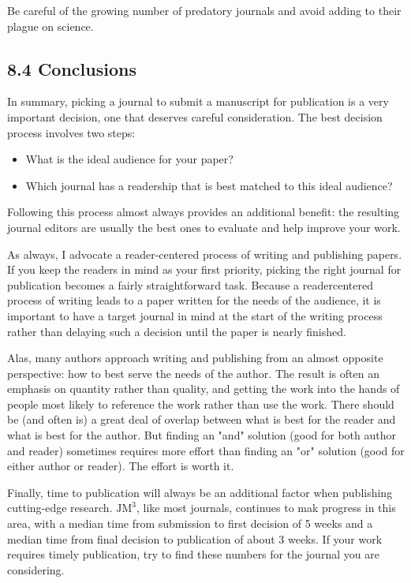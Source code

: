 Be careful of the growing number of predatory journals and avoid adding to their plague on science.

\subsection*{8.4 Conclusions}
In summary, picking a journal to submit a manuscript for publication is a very important decision, one that deserves careful consideration. The best decision process involves two steps:

\begin{itemize}
  \item What is the ideal audience for your paper?
  \item Which journal has a readership that is best matched to this ideal audience?
\end{itemize}

Following this process almost always provides an additional benefit: the resulting journal editors are usually the best ones to evaluate and help improve your work.

As always, I advocate a reader-centered process of writing and publishing papers. If you keep the readers in mind as your first priority, picking the right journal for publication becomes a fairly straightforward task. Because a readercentered process of writing leads to a paper written for the needs of the audience, it is important to have a target journal in mind at the start of the writing process rather than delaying such a decision until the paper is nearly finished.

Alas, many authors approach writing and publishing from an almost opposite perspective: how to best serve the needs of the author. The result is often an emphasis on quantity rather than quality, and getting the work into the hands of people most likely to reference the work rather than use the work. There should be (and often is) a great deal of overlap between what is best for the reader and what is best for the author. But finding an "and" solution (good for both author and reader) sometimes requires more effort than finding an "or" solution (good for either author or reader). The effort is worth it.

Finally, time to publication will always be an additional factor when publishing cutting-edge research. $\mathrm{JM}^{3}$, like most journals, continues to mak progress in this area, with a median time from submission to first decision of 5 weeks and a median time from final decision to publication of about 3 weeks. If your work requires timely publication, try to find these numbers for the journal you are considering.

